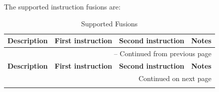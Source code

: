 \documentclass{article}
\begin{document}
The supported instruction fusions are:\\
\begin{longtable}{|p{2in}|p{1in}|p{1in}|p{2in}|}
\caption{Supported Fusions}
\\\hline
{\bf Description} & {\bf First instruction} & {\bf Second instruction} & {\bf Notes} \\
\hline
\endfirsthead

\hline
\multicolumn{4}{|r|}{{\tablename\ \thetable{} -- Continued from previous page}} \\
\hline
{\bf Description} & {\bf First instruction} & {\bf Second instruction} & {\bf Notes} \\
\hline
\endhead

\hline
\multicolumn{4}{|r|}{{Continued on next page}} \\
\hline
\endfoot
\hline
\endlastfoot


\end{longtable}
\end{document}
